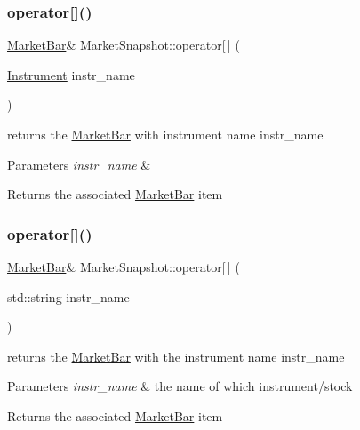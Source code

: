 \subsubsection{\texorpdfstring{operator[]()}{operator[]()}\hspace{0.1cm}{\footnotesize\ttfamily [1/2]}}
{\footnotesize\ttfamily \hyperlink{classMarketBar}{Market\+Bar}\& Market\+Snapshot\+::operator\mbox{[}$\,$\mbox{]} (\begin{DoxyParamCaption}\item[{\hyperlink{classInstrument}{Instrument}}]{instr\+\_\+name }\end{DoxyParamCaption})}



returns the \hyperlink{classMarketBar}{Market\+Bar} with instrument name {\ttfamily instr\+\_\+name} 


\begin{DoxyParams}{Parameters}
{\em instr\+\_\+name} & \\
\hline
\end{DoxyParams}
\begin{DoxyReturn}{Returns}
the associated \hyperlink{classMarketBar}{Market\+Bar} item 
\end{DoxyReturn}
\mbox{\label{classMarketSnapshot_a5029cc166d5c7b895686a25feb0c3af4}} 
\subsubsection{\texorpdfstring{operator[]()}{operator[]()}\hspace{0.1cm}{\footnotesize\ttfamily [2/2]}}
{\footnotesize\ttfamily \hyperlink{classMarketBar}{Market\+Bar}\& Market\+Snapshot\+::operator\mbox{[}$\,$\mbox{]} (\begin{DoxyParamCaption}\item[{std\+::string}]{instr\+\_\+name }\end{DoxyParamCaption})}



returns the \hyperlink{classMarketBar}{Market\+Bar} with the instrument name \textquotesingle{}instr\+\_\+name\textquotesingle{} 


\begin{DoxyParams}{Parameters}
{\em instr\+\_\+name} & the name of which instrument/stock \\
\hline
\end{DoxyParams}
\begin{DoxyReturn}{Returns}
the associated \hyperlink{classMarketBar}{Market\+Bar} item 
\end{DoxyReturn}
\mbox{\label{classMarketSnapshot_a4bc2e6b766eff94c43aa5a45282f797f}} 
